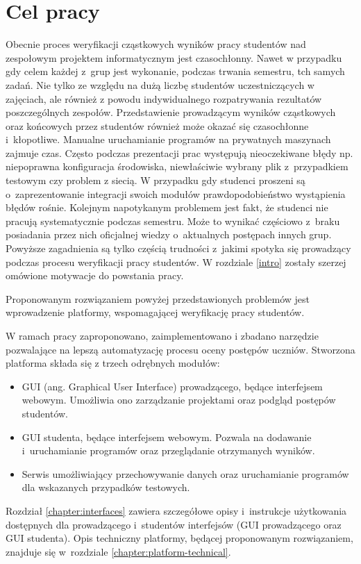 \chapter{Cel pracy}

Obecnie proces weryfikacji cząstkowych wyników pracy studentów nad zespołowym projektem informatycznym jest czasochłonny.
Nawet w przypadku gdy celem każdej z~grup jest wykonanie, podczas trwania semestru, tch samych zadań.
Nie tylko ze względu na dużą liczbę studentów uczestniczących w zajęciach, ale również z powodu indywidualnego rozpatrywania rezultatów poszczególnych zespołów.
Przedstawienie prowadzącym wyników cząstkowych oraz końcowych przez studentów również może okazać się czasochłonne i~kłopotliwe.
Manualne uruchamianie programów na prywatnych maszynach zajmuje czas.
Często podczas prezentacji prac występują nieoczekiwane błędy np. niepoprawna konfiguracja środowiska, niewłaściwie wybrany plik z~przypadkiem testowym czy problem z siecią.
W przypadku gdy studenci proszeni są o~zaprezentowanie integracji swoich modułów prawdopodobieństwo wystąpienia błędów rośnie.
Kolejnym napotykanym problemem jest fakt, że studenci nie pracują systematycznie podczas semestru.
Może to wynikać częściowo z~braku posiadania przez nich oficjalnej wiedzy o~aktualnych postępach innych grup.
Powyższe zagadnienia są tylko częścią trudności z~jakimi spotyka się prowadzący podczas procesu weryfikacji pracy studentów.
W rozdziale \ref{intro} zostały szerzej omówione motywacje do powstania pracy.

Proponowanym rozwiązaniem powyżej przedstawionych problemów jest wprowadzenie platformy, wspomagającej weryfikację pracy studentów.

W ramach pracy zaproponowano, zaimplementowano i zbadano narzędzie pozwalające na lepszą automatyzację procesu oceny postępów uczniów.
Stworzona platforma składa się z trzech odrębnych modułów:
\begin{itemize}
    \item GUI (ang. Graphical User Interface) prowadzącego, będące interfejsem webowym. Umożliwia ono zarządzanie projektami oraz podgląd postępów studentów.
    \item GUI studenta, będące interfejsem webowym. Pozwala na dodawanie i~uruchamianie programów oraz przeglądanie otrzymanych wyników.
    \item Serwis umożliwiający przechowywanie danych oraz uruchamianie programów dla wskazanych przypadków testowych.
\end{itemize}
Rozdział \ref{chapter:interfaces} zawiera szczegółowe opisy i~instrukcje użytkowania dostępnych dla prowadzącego i~studentów interfejsów (GUI prowadzącego oraz GUI studenta).
Opis techniczny platformy, będącej proponowanym rozwiązaniem, znajduje się w~rozdziale \ref{chapter:platform-technical}.

